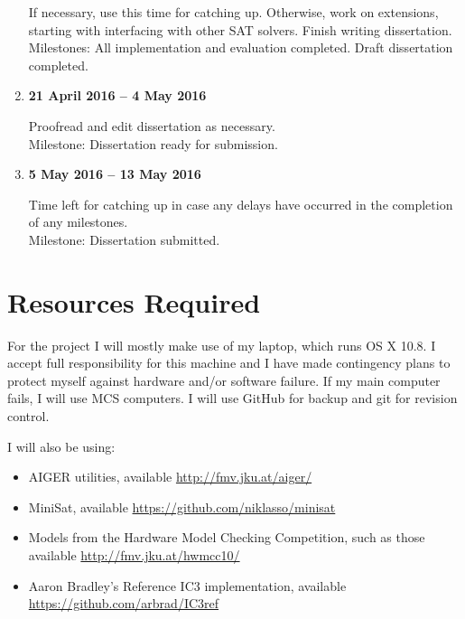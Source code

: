 \documentclass[12pt,a4paper,twoside]{article}
\begin{document}
\begin{enumerate}
If necessary, use this time for catching up.
Otherwise, work on extensions, starting with interfacing with other
SAT solvers.
Finish writing dissertation.
\\
Milestones: All implementation and evaluation completed.
Draft dissertation completed.

\item {\bf 21 April 2016 -- 4 May 2016}

Proofread and edit dissertation as necessary.
\\
Milestone: Dissertation ready for submission.

\item {\bf 5 May 2016 -- 13 May 2016}

Time left for catching up in case any delays have occurred in the
completion of any milestones.
\\
Milestone: Dissertation submitted.

\end{enumerate}

\section*{Resources Required}

For the project I will mostly make use of my laptop, which runs OS X 10.8.
I accept full responsibility for this machine and I have made contingency
plans to protect myself against hardware and/or software failure. 
If my main computer fails, I will use MCS computers.
I will use GitHub for backup and git for revision control.

\noindent I will also be using:
\begin{itemize}
\item AIGER utilities, available \url{http://fmv.jku.at/aiger/}
\item MiniSat, available \url{https://github.com/niklasso/minisat}
\item Models from the Hardware Model Checking Competition, such as those
available \url{http://fmv.jku.at/hwmcc10/}
\item Aaron Bradley's Reference IC3 implementation, available
\url{https://github.com/arbrad/IC3ref}
\end{itemize}
\end{document}
